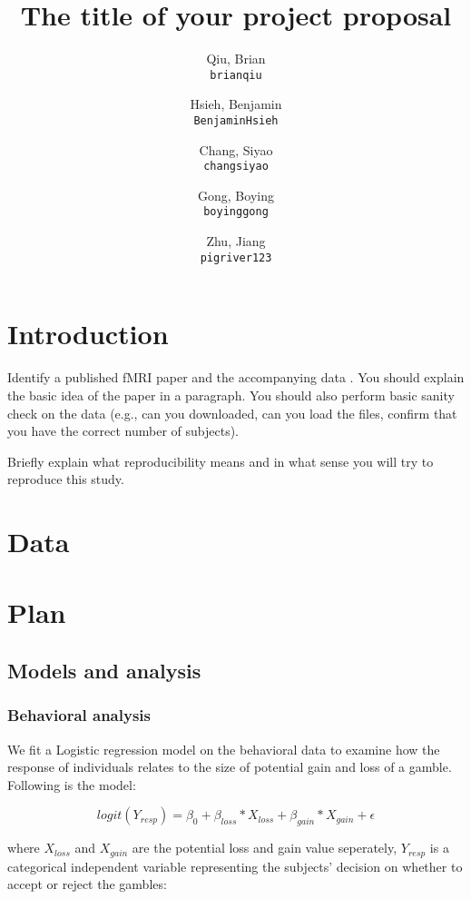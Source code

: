 \documentclass[11pt]{article}
\title{The title of your project proposal}
\author{
  Qiu, Brian\\
  \texttt{brianqiu}
  \and
  Hsieh, Benjamin\\
  \texttt{BenjaminHsieh}
  \and
   Chang, Siyao \\
  \texttt{changsiyao}
  \and
  Gong, Boying\\
  \texttt{boyinggong}
  \and
  Zhu, Jiang\\
  \texttt{pigriver123}
}
\begin{document}
\maketitle


\section{Introduction}

Identify a published fMRI paper and the accompanying data
\cite{lindquist2008statistical}.  You should explain the basic idea of the
paper in a paragraph.  You should also perform basic sanity check on the data
(e.g., can you downloaded, can you load the files, confirm that you have the
correct number of subjects).

Briefly explain what reproducibility means and in what sense you will
try to reproduce this study.

\section{Data}

\section{Plan}

\subsection{Models and analysis}

\subsubsection{Behavioral analysis}

We fit a Logistic regression model on the behavioral data to examine how the response of individuals relates to the size of potential gain and loss of a gamble. Following is the model:

\begin{equation}
logit(Y_{resp}) = \beta_0 + \beta_{loss} *X_{loss} + \beta_{gain} * X_{gain}  + \epsilon
\end{equation}

where $X_{loss}$ and $X_{gain}$ are the potential loss and gain value seperately, $Y_{resp}$ is a categorical independent variable representing the subjects' decision on whether to accept or reject the gambles:
\end{document}
